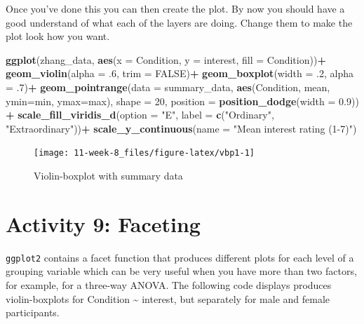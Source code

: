\documentclass[]{book}
\newenvironment{Shaded}{\begin{snugshade}}{\end{snugshade}}
\newcommand{\DataTypeTok}[1]{\textcolor[rgb]{0.13,0.29,0.53}{#1}}
\newcommand{\DecValTok}[1]{\textcolor[rgb]{0.00,0.00,0.81}{#1}}
\newcommand{\FloatTok}[1]{\textcolor[rgb]{0.00,0.00,0.81}{#1}}
\newcommand{\KeywordTok}[1]{\textcolor[rgb]{0.13,0.29,0.53}{\textbf{#1}}}
\newcommand{\NormalTok}[1]{#1}
\newcommand{\OperatorTok}[1]{\textcolor[rgb]{0.81,0.36,0.00}{\textbf{#1}}}
\newcommand{\OtherTok}[1]{\textcolor[rgb]{0.56,0.35,0.01}{#1}}
\newcommand{\StringTok}[1]{\textcolor[rgb]{0.31,0.60,0.02}{#1}}
\begin{document}
Once you've done this you can then create the plot. By now you should have a good understand of what each of the layers are doing. Change them to make the plot look how you want.

\begin{Shaded}
\begin{Highlighting}[]
\KeywordTok{ggplot}\NormalTok{(zhang_data, }\KeywordTok{aes}\NormalTok{(}\DataTypeTok{x =}\NormalTok{ Condition, }\DataTypeTok{y =}\NormalTok{ interest, }\DataTypeTok{fill =}\NormalTok{ Condition))}\OperatorTok{+}
\StringTok{  }\KeywordTok{geom_violin}\NormalTok{(}\DataTypeTok{alpha =} \FloatTok{.6}\NormalTok{, }\DataTypeTok{trim =} \OtherTok{FALSE}\NormalTok{)}\OperatorTok{+}
\StringTok{  }\KeywordTok{geom_boxplot}\NormalTok{(}\DataTypeTok{width =} \FloatTok{.2}\NormalTok{, }\DataTypeTok{alpha =} \FloatTok{.7}\NormalTok{)}\OperatorTok{+}
\StringTok{  }\KeywordTok{geom_pointrange}\NormalTok{(}\DataTypeTok{data =}\NormalTok{ summary_data,}
                  \KeywordTok{aes}\NormalTok{(Condition, mean, }\DataTypeTok{ymin=}\NormalTok{min, }\DataTypeTok{ymax=}\NormalTok{max),}
                  \DataTypeTok{shape =} \DecValTok{20}\NormalTok{, }
                  \DataTypeTok{position =} \KeywordTok{position_dodge}\NormalTok{(}\DataTypeTok{width =} \FloatTok{0.9}\NormalTok{)) }\OperatorTok{+}
\StringTok{  }\KeywordTok{scale_fill_viridis_d}\NormalTok{(}\DataTypeTok{option =} \StringTok{"E"}\NormalTok{, }\DataTypeTok{label =} \KeywordTok{c}\NormalTok{(}\StringTok{"Ordinary"}\NormalTok{, }\StringTok{"Extraordinary"}\NormalTok{))}\OperatorTok{+}
\StringTok{  }\KeywordTok{scale_y_continuous}\NormalTok{(}\DataTypeTok{name =} \StringTok{"Mean interest rating (1-7)"}\NormalTok{)}
\end{Highlighting}
\end{Shaded}

\begin{figure}

{\centering \texttt{[image: 11-week-8\_files/figure-latex/vbp1-1]} 

}

\caption{Violin-boxplot with summary data}\label{fig:vbp1}
\end{figure}

\hypertarget{activity-9-faceting}{%
\section{Activity 9: Faceting}\label{activity-9-faceting}}

\texttt{ggplot2} contains a facet function that produces different plots for each level of a grouping variable which can be very useful when you have more than two factors, for example, for a three-way ANOVA. The following code displays produces violin-boxplots for Condition \textasciitilde{} interest, but separately for male and female participants.
\end{document}
